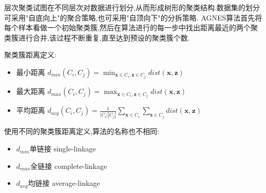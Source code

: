 层次聚类试图在不同层次对数据进行划分,从而形成树形的聚类结构.数据集的划分可采用"自底向上"的聚合策略,也可采用"自顶向下"的分拆策略.
AGNES算法首先将每个样本看做一个初始聚类簇,然后在算法进行的每一步中找出距离最近的两个聚类簇进行合并,该过程不断重复,直至达到预设的聚类簇个数.

聚类簇距离定义:
\begin{itemize}
\item 最小距离 $d_{min}(C_i,C_j)=\min_{\mathbf{x}\in C_i, \mathbf{z}\in C_j}dist(\mathbf{x,z})$
\item 最大距离 $d_{max}(C_i,C_j)=\max_{\mathbf{x}\in C_i, \mathbf{z}\in C_j}dist(\mathbf{x,z})$
\item 平均距离 $d_{avg}(C_i,C_j)=\frac{1}{|C_i||C_j|}\sum_{\mathbf{x}\in C_i}\sum_{\mathbf{z}\in C_j}dist(\mathbf{x,z})$
\end{itemize}

使用不同的聚类簇距离定义,算法的名称也不相同:
\begin{itemize}
\item $d_{min}$单链接 single-linkage
\item $d_{max}$全链接 complete-linkage
\item $d_{avg}$均链接 average-linkage
\end{itemize}